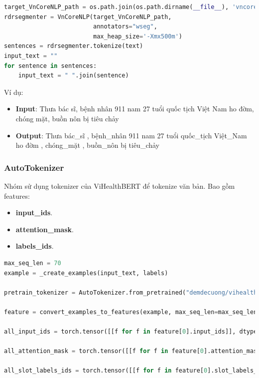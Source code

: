 \lstset{style=mystyle}
\begin{lstlisting}[language=Python]
target_VnCoreNLP_path = os.path.join(os.path.dirname(__file__), 'vncorenlp/VnCoreNLP-1.1.1.jar')
rdrsegmenter = VnCoreNLP(target_VnCoreNLP_path,
                         annotators="wseg",
                         max_heap_size='-Xmx500m')
sentences = rdrsegmenter.tokenize(text)
input_text = ""
for sentence in sentences:
    input_text = " ".join(sentence)
\end{lstlisting}
Ví dụ:
\begin{itemize}
    \item \textbf{Input}: Thưa bác sĩ, bệnh nhân 911 nam 27 tuổi quốc tịch Việt Nam ho đờm, chóng mặt, buồn nôn bị tiêu chảy
    \item \textbf{Output}: Thưa bác\_sĩ , bệnh\_nhân 911 nam 27 tuổi quốc\_tịch Việt\_Nam ho đờm , chóng\_mặt , buồn\_nôn bị tiêu\_chảy
\end{itemize}

\subsubsection{AutoTokenizer}
Nhóm sử dụng tokenizer của ViHealthBERT để tokenize văn bản. Bao gồm features:
\begin{itemize}
    \item \textbf{input\_ids}.
    \item \textbf{attention\_mask}.
    \item \textbf{labels\_ids}.
\end{itemize}
\lstset{style=mystyle}
\begin{lstlisting}[language=Python]
max_seq_len = 70
example = _create_examples(input_text, labels)

pretrain_tokenizer = AutoTokenizer.from_pretrained("demdecuong/vihealthbert-base-word")

feature = convert_examples_to_features(example, max_seq_len=max_seq_len,tokenizer=pretrain_tokenizer,pad_token_label_id=0)

all_input_ids = torch.tensor([[f for f in feature[0].input_ids]], dtype=torch.long)

all_attention_mask = torch.tensor([[f for f in feature[0].attention_mask]], dtype=torch.long)

all_slot_labels_ids = torch.tensor([[f for f in feature[0].slot_labels_ids]], dtype=torch.long)
\end{lstlisting}

